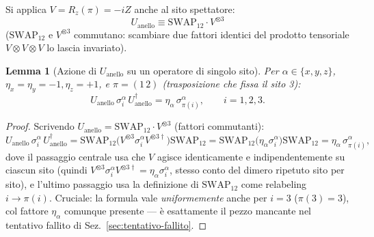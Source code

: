 \documentclass[11pt,a4paper]{article}
\newtheorem{lemma}{Lemma}
\begin{document}
Si applica $V=R_z(\pi)=-iZ$ anche al sito spettatore:
\begin{equation}
\boxed{\;U_{\mathrm{anello}} \equiv \mathrm{SWAP}_{12}\cdot V^{\otimes3}\;}
\end{equation}
($\mathrm{SWAP}_{12}$ e $V^{\otimes3}$ commutano: scambiare due fattori identici del prodotto
tensoriale $V\otimes V\otimes V$ lo lascia invariato).

\begin{lemma}[Azione di $U_{\mathrm{anello}}$ su un operatore di singolo sito]
\label{lem:U-singolo}
Per $\alpha\in\{x,y,z\}$, $\eta_x=\eta_y=-1,\eta_z=+1$, e $\pi=(1\,2)$ (trasposizione che fissa
il sito 3):
\begin{equation}
U_{\mathrm{anello}}\,\sigma_i^\alpha\,U_{\mathrm{anello}}^\dagger = \eta_\alpha\,\sigma_{\pi(i)}^\alpha,
\qquad i=1,2,3.
\end{equation}
\end{lemma}
\begin{proof}
Scrivendo $U_{\mathrm{anello}}=\mathrm{SWAP}_{12}\cdot V^{\otimes3}$ (fattori commutanti):
$$U_{\mathrm{anello}}\,\sigma_i^\alpha\,U_{\mathrm{anello}}^\dagger
= \mathrm{SWAP}_{12}\big(V^{\otimes3}\sigma_i^\alpha V^{\otimes3\dagger}\big)\mathrm{SWAP}_{12}
= \mathrm{SWAP}_{12}\big(\eta_\alpha\sigma_i^\alpha\big)\mathrm{SWAP}_{12}
= \eta_\alpha\,\sigma_{\pi(i)}^\alpha,$$
dove il passaggio centrale usa che $V$ agisce identicamente e indipendentemente su ciascun sito
(quindi $V^{\otimes3}\sigma_i^\alpha V^{\otimes3\dagger}=\eta_\alpha\sigma_i^\alpha$, stesso
conto del dimero ripetuto sito per sito), e l'ultimo passaggio usa la definizione di
$\mathrm{SWAP}_{12}$ come relabeling $i\to\pi(i)$. Cruciale: la formula vale
\emph{uniformemente} anche per $i=3$ ($\pi(3)=3$), col fattore $\eta_\alpha$ comunque presente
--- è esattamente il pezzo mancante nel tentativo fallito di
Sez.~\ref{sec:tentativo-fallito}.
\end{proof}
\end{document}
